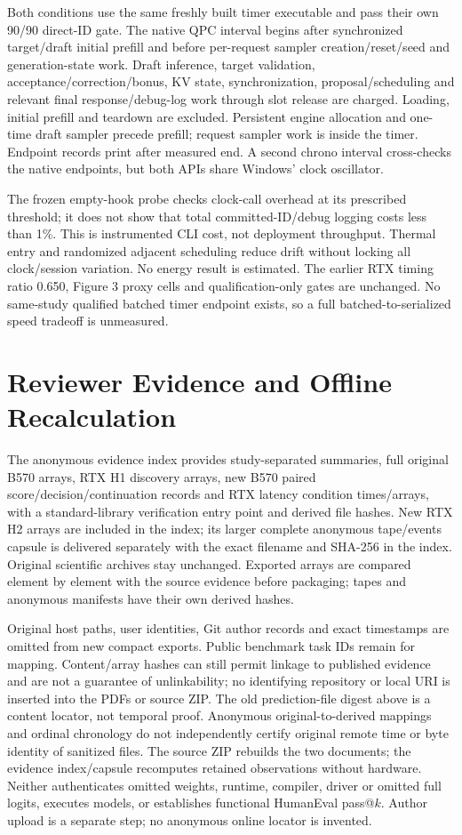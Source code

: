 Both conditions use the same freshly built timer executable and pass their own 90/90 direct-ID gate. The native QPC interval begins after synchronized target/draft initial prefill and before per-request sampler creation/reset/seed and generation-state work. Draft inference, target validation, acceptance/correction/bonus, KV state, synchronization, proposal/scheduling and relevant final response/debug-log work through slot release are charged. Loading, initial prefill and teardown are excluded. Persistent engine allocation and one-time draft sampler precede prefill; request sampler work is inside the timer. Endpoint records print after measured end. A second chrono interval cross-checks the native endpoints, but both APIs share Windows' clock oscillator.

The frozen empty-hook probe checks clock-call overhead at its prescribed threshold; it does not show that total committed-ID/debug logging costs less than 1\%. This is instrumented CLI cost, not deployment throughput. Thermal entry and randomized adjacent scheduling reduce drift without locking all clock/session variation. No energy result is estimated. The earlier RTX timing ratio 0.650, Figure 3 proxy cells and qualification-only gates are unchanged. No same-study qualified batched timer endpoint exists, so a full batched-to-serialized speed tradeoff is unmeasured.

\section{Reviewer Evidence and Offline Recalculation}
The anonymous evidence index provides study-separated summaries, full original B570 arrays, RTX H1 discovery arrays, new B570 paired score/decision/continuation records and RTX latency condition times/arrays, with a standard-library verification entry point and derived file hashes. New RTX H2 arrays are included in the index; its larger complete anonymous tape/events capsule is delivered separately with the exact filename and SHA-256 in the index. Original scientific archives stay unchanged. Exported arrays are compared element by element with the source evidence before packaging; tapes and anonymous manifests have their own derived hashes.

Original host paths, user identities, Git author records and exact timestamps are omitted from new compact exports. Public benchmark task IDs remain for mapping. Content/array hashes can still permit linkage to published evidence and are not a guarantee of unlinkability; no identifying repository or local URI is inserted into the PDFs or source ZIP. The old prediction-file digest above is a content locator, not temporal proof. Anonymous original-to-derived mappings and ordinal chronology do not independently certify original remote time or byte identity of sanitized files. The source ZIP rebuilds the two documents; the evidence index/capsule recomputes retained observations without hardware. Neither authenticates omitted weights, runtime, compiler, driver or omitted full logits, executes models, or establishes functional HumanEval pass@$k$. Author upload is a separate step; no anonymous online locator is invented.
